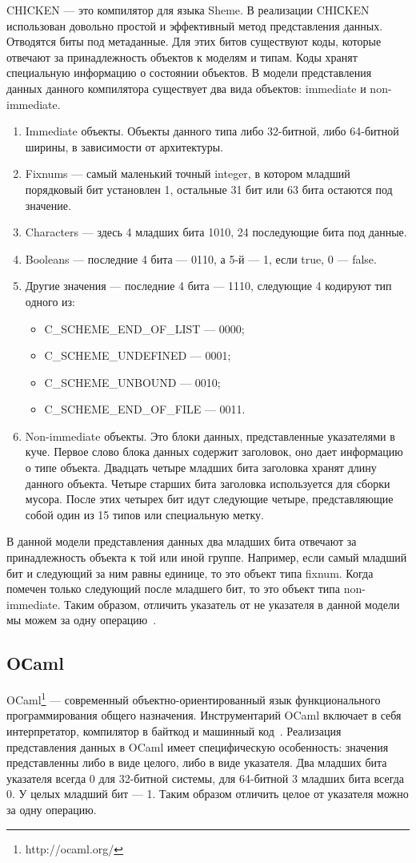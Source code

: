 \documentclass[12pt,a4paper]{article}
\begin{document}
CHICKEN — это компилятор для языка Sheme.
В реализации CHIСKEN использован довольно простой и эффективный метод представления данных.
Отводятся биты под метаданные. Для этих битов существуют коды, которые отвечают за
принадлежность объектов к моделям и типам. Коды хранят специальную информацию о состоянии объектов.
В  модели представления данных данного компилятора
существует два вида объектов: immediate и non-immediate.
\begin{enumerate}
\item Immediate объекты.
Объекты данного типа либо 32-битной, либо 64-битной ширины, в зависимости от архитектуры.
\item[1)] Fixnums — самый маленький точный integer, в котором младший порядковый бит 
установлен 1, остальные 31 бит или 63 бита остаются под значение.
\item[2)] Characters — здесь 4 младших бита 1010, 24 последующие бита под данные.
\item[3)] Booleans — последние 4 бита — 0110, а 5-й — 1, если true, 0 — false.
\item[4)] Другие значения — последние 4 бита — 1110, следующие 4 кодируют тип одного из:
\begin{itemize}
\item C\_SCHEME\_END\_OF\_LIST — 0000;
\item C\_SCHEME\_UNDEFINED — 0001;
\item C\_SCHEME\_UNBOUND — 0010;
\item C\_SCHEME\_END\_OF\_FILE — 0011.
\end{itemize}
\item Non-immediate объекты.
Это блоки данных, представленные указателями в куче.
Первое слово блока данных содержит заголовок, оно дает информацию о типе объекта. 
Двадцать четыре младших бита заголовка хранят длину данного объекта.
Четыре старших бита заголовка используется для сборки 
мусора.
После этих четырех бит идут следующие четыре, представляющие собой один из 15 типов или специальную метку.
\end{enumerate}
В данной модели представления данных два младших бита отвечают за принадлежность объекта к той или иной 
группе. Например, если самый младший бит и следующий за ним равны единице, то это объект типа fixnum.
Когда помечен только следующий после младшего бит, то это объект типа non-immediate.
Таким образом, отличить указатель от не указателя в данной модели мы можем за одну операцию~\cite{chiken}.
\subsection {OСaml}
OCaml\footnote{http://ocaml.org/} — современный объектно-ориентированный язык функционального программирования общего назначения. 
Инструментарий OCaml включает в себя интерпретатор, компилятор в байткод и машинный код~\cite{ocaml2}.
Реализация представления данных в OCaml имеет специфическую особенность:
значения представленны либо в виде целого, либо в виде указателя.
Два младших бита указателя всегда 0 для 32-битной системы, для 64-битной 3 младших бита всегда 0. У целых младший бит — 1. 
Таким образом отличить целое от указателя можно за одну операцию.
\end{document}
